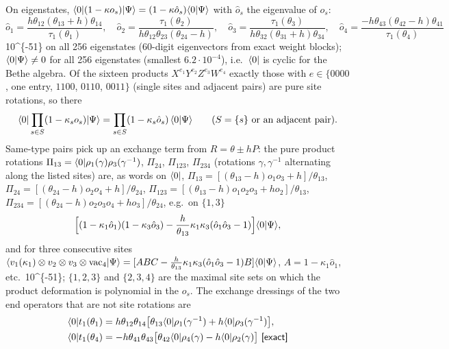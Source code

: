 On eigenstates, $\langle0|(1-\kappa o_s)|\Psi\rangle=(1-\kappa\hat o_s)\langle0|\Psi\rangle$ with $\hat o_s$ the eigenvalue of $o_s$:
\begin{equation}
 \hat o_1=\frac{h\theta_{12}(\theta_{13}+h)\theta_{14}}{\tau_1(\theta_1)},\quad
 \hat o_2=\frac{\tau_1(\theta_2)}{h\theta_{12}\theta_{23}(\theta_{24}-h)},\quad
 \hat o_3=\frac{\tau_1(\theta_3)}{h\theta_{32}(\theta_{31}+h)\theta_{34}},\quad
 \hat o_4=\frac{-h\theta_{43}(\theta_{42}-h)\theta_{41}}{\tau_1(\theta_4)}
\end{equation}
\num{10^{-51}} on all 256 eigenstates (60-digit eigenvectors from exact weight blocks); $\langle0|\Psi\rangle\neq0$ for all 256
eigenstates (smallest $6.2\cdot10^{-4}$), i.e.\ $\langle0|$ is cyclic for the Bethe algebra.
Of the sixteen products $X^{e_1}Y^{e_2}Z^{e_3}W^{e_4}$ exactly those with $e\in\{0000$, one entry, $1100$, $0110$, $0011\}$
(single sites and adjacent pairs) are pure site rotations, so there
\begin{equation}
 \langle0|\prod_{s\in S}(1-\kappa_so_s)|\Psi\rangle=\prod_{s\in S}(1-\kappa_s\hat o_s)\,\langle0|\Psi\rangle\qquad(S=\{s\}\ \text{or an adjacent pair}).
\end{equation}
Same-type pairs pick up an exchange term from $R=\theta\pm hP$: the pure product rotations $\Pi_{13}=\langle0|\rho_1(\gamma)\rho_3(\gamma^{-1})$,
$\Pi_{24}$, $\Pi_{123}$, $\Pi_{234}$ (rotations $\gamma,\gamma^{-1}$ alternating along the listed sites) are, as words on $\langle0|$,
$\Pi_{13}=[(\theta_{13}-h)o_1o_3+h]/\theta_{13}$, $\Pi_{24}=[(\theta_{24}-h)o_2o_4+h]/\theta_{24}$,
$\Pi_{123}=[(\theta_{13}-h)o_1o_2o_3+ho_2]/\theta_{13}$, $\Pi_{234}=[(\theta_{24}-h)o_2o_3o_4+ho_3]/\theta_{24}$, e.g.\ on $\{1,3\}$
\begin{equation}
 \Big[(1-\kappa_1\hat o_1)(1-\kappa_3\hat o_3)-\frac h{\theta_{13}}\kappa_1\kappa_3(\hat o_1\hat o_3-1)\Big]\langle0|\Psi\rangle,
\end{equation}
and for three consecutive sites $\langle v_1(\kappa_1)\otimes v_2\otimes v_3\otimes\mathrm{vac}_4|\Psi\rangle=
[ABC-\tfrac h{\theta_{13}}\kappa_1\kappa_3(\hat o_1\hat o_3-1)B]\langle0|\Psi\rangle$, $A=1-\kappa_1\hat o_1$, etc.\ \num{10^{-51}};
$\{1,2,3\}$ and $\{2,3,4\}$ are the maximal site sets on which the product deformation is polynomial in the $o_s$. The exchange
dressings of the two end operators that are not site rotations are
\begin{align}
 \bra0t_1(\theta_1)&=h\theta_{12}\theta_{14}\big[\theta_{13}\bra0\rho_1(\gamma^{-1})+h\bra0\rho_3(\gamma^{-1})\big],\nonumber\\
 \bra0t_1(\theta_4)&=-h\theta_{41}\theta_{43}\big[\theta_{42}\bra0\rho_4(\gamma)-h\bra0\rho_2(\gamma)\big]\ \ex
\end{align}
